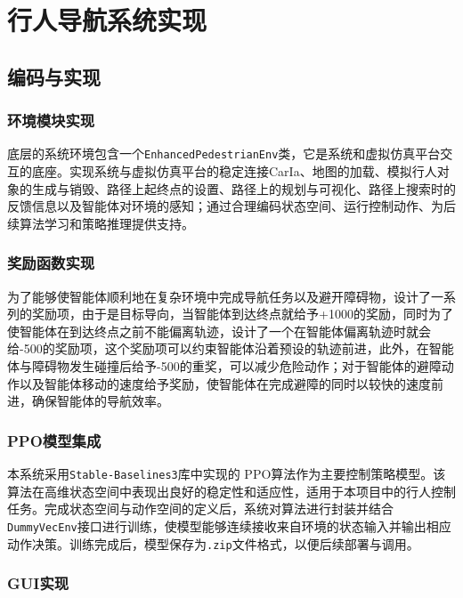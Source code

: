 \chapter{行人导航系统实现}

\section{编码与实现}

\subsection{环境模块实现}

底层的系统环境包含一个\texttt{EnhancedPedestrianEnv}类，它是系统和虚拟仿真平台交互的底座。实现系统与虚拟仿真平台的稳定连接CarIa、地图的加载、模拟行人对象的生成与销毁、路径上起终点的设置、路径上的规划与可视化、路径上搜索时的反馈信息以及智能体对环境的感知；通过合理编码状态空间、运行控制动作、为后续算法学习和策略推理提供支持。

\subsection{奖励函数实现}

为了能够使智能体顺利地在复杂环境中完成导航任务以及避开障碍物，设计了一系列的奖励项，由于是目标导向，当智能体到达终点就给予+1000的奖励，同时为了使智能体在到达终点之前不能偏离轨迹，设计了一个在智能体偏离轨迹时就会给-500的奖励项，这个奖励项可以约束智能体沿着预设的轨迹前进，此外，在智能体与障碍物发生碰撞后给予-500的重奖，可以减少危险动作；对于智能体的避障动作以及智能体移动的速度给予奖励，使智能体在完成避障的同时以较快的速度前进，确保智能体的导航效率。

\subsection{PPO模型集成}

本系统采用\texttt{Stable-Baselines3}库中实现的 PPO算法作为主要控制策略模型。该算法在高维状态空间中表现出良好的稳定性和适应性，适用于本项目中的行人控制任务。完成状态空间与动作空间的定义后，系统对算法进行封装并结合\texttt{DummyVecEnv}接口进行训练，使模型能够连续接收来自环境的状态输入并输出相应动作决策。训练完成后，模型保存为\texttt{.zip}文件格式，以便后续部署与调用。

\subsection{GUI实现}


